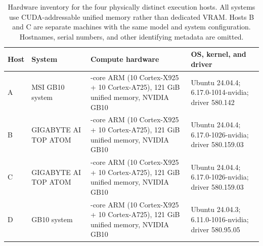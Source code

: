 \begin{table}[t]
\centering
\small
\setlength{\tabcolsep}{5pt}
\begin{tabular}{>{\raggedright\arraybackslash}p{}
                >{\raggedright\arraybackslash}p{}
                >{\raggedright\arraybackslash}p{}
                >{\raggedright\arraybackslash}p{}}
\toprule
Host & System & Compute hardware & OS, kernel, and driver \\
\midrule
A & MSI GB10 system &
20-core ARM (10 Cortex-X925 + 10 Cortex-A725), 121 GiB unified memory,
NVIDIA GB10 &
Ubuntu 24.04.4; 6.17.0-1014-nvidia; driver 580.142 \\
\midrule
B & GIGABYTE AI TOP ATOM &
20-core ARM (10 Cortex-X925 + 10 Cortex-A725), 121 GiB unified memory,
NVIDIA GB10 &
Ubuntu 24.04.4; 6.17.0-1026-nvidia; driver 580.159.03 \\
\midrule
C & GIGABYTE AI TOP ATOM &
20-core ARM (10 Cortex-X925 + 10 Cortex-A725), 121 GiB unified memory,
NVIDIA GB10 &
Ubuntu 24.04.4; 6.17.0-1026-nvidia; driver 580.159.03 \\
\midrule
D & GB10 system &
20-core ARM (10 Cortex-X925 + 10 Cortex-A725), 121 GiB unified memory,
NVIDIA GB10 &
Ubuntu 24.04.3; 6.11.0-1016-nvidia; driver 580.95.05 \\
\bottomrule
\end{tabular}
\caption{Hardware inventory for the four physically distinct execution
hosts. All systems use CUDA-addressable unified memory rather than dedicated
VRAM. Hosts B and C are separate machines with the same model and system
configuration. Hostnames, serial numbers, and other identifying metadata are
omitted.}
\label{tab:supp-execution-hosts}
\end{table}
